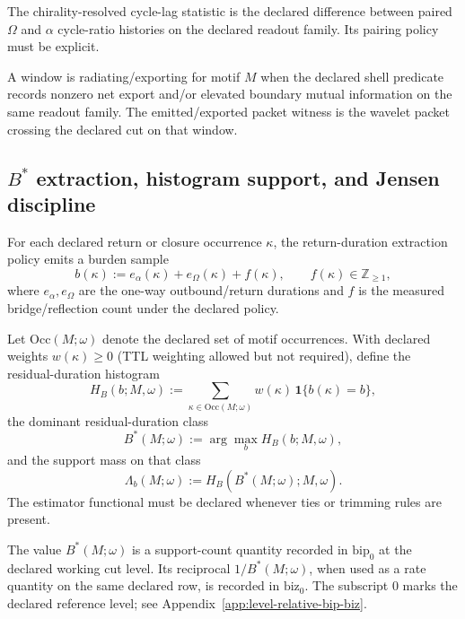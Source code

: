 \begin{definition}
\label{def:phase-lag}
The chirality-resolved cycle-lag statistic is the declared difference between paired $\Omega$ and $\alpha$ cycle-ratio histories on the declared readout family. Its pairing policy must be explicit.
\end{definition}

\begin{definition}
\label{def:radiating-window}
A window is radiating/exporting for motif $M$ when the declared shell predicate records nonzero net export and/or elevated boundary mutual information on the same readout family. The emitted/exported packet witness is the wavelet packet crossing the declared cut on that window.
\end{definition}

\subsection{\texorpdfstring{$B^*$}{B*} extraction, histogram support, and Jensen discipline}
\begin{definition}
\label{def:b-extraction}
For each declared return or closure occurrence $\kappa$, the return-duration extraction policy emits a burden sample
\[
b(\kappa):=e_\alpha(\kappa)+e_\Omega(\kappa)+f(\kappa),\qquad f(\kappa)\in\mathbb Z_{\ge 1},
\]
where $e_\alpha,e_\Omega$ are the one-way outbound/return durations and $f$ is the measured bridge/reflection count under the declared policy.
\end{definition}

\begin{definition}
\label{def:bstar-histogram}
Let $\mathrm{Occ}(M;\omega)$ denote the declared set of motif occurrences. With declared weights $w(\kappa)\ge 0$ (TTL weighting allowed but not required), define the residual-duration histogram
\[
H_B(b;M,\omega):=\sum_{\kappa\in\mathrm{Occ}(M;\omega)} w(\kappa)\,\mathbf 1\{b(\kappa)=b\},
\]
the dominant residual-duration class
\[
B^*(M;\omega):=\arg\max_b H_B(b;M,\omega),
\]
and the support mass on that class
\[
\Lambda_b(M;\omega):=H_B(B^*(M;\omega);M,\omega).
\]
The estimator functional must be declared whenever ties or trimming rules are present.

The value \(B^*(M;\omega)\) is a support-count quantity recorded in \(\mathrm{bip}_0\) at the declared working cut level. Its reciprocal \(1/B^*(M;\omega)\), when used as a rate quantity on the same declared row, is recorded in \(\mathrm{biz}_0\). The subscript \(0\) marks the declared reference level; see Appendix~\ref{app:level-relative-bip-biz}.
\end{definition}

